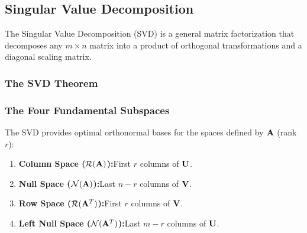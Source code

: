 \documentclass[../readings.tex]{subfiles}
\begin{document}
\subsection{Singular Value Decomposition}
\label{sub:svd-theory}

The Singular Value Decomposition (SVD) is a general matrix factorization that decomposes any $m \times n$ matrix into a product of orthogonal transformations and a diagonal scaling matrix.

\subsubsection{The SVD Theorem}

\label{thm:svd}


\subsubsection{The Four Fundamental Subspaces}

The SVD provides optimal orthonormal bases for the spaces defined by $\mathbf{A}$ (rank $r$):
\begin{enumerate}
    \item \textbf{Column Space ($\mathcal{R}(\mathbf{A})$):}\enspace First $r$ columns of $\mathbf{U}$.
    \item \textbf{Null Space ($\mathcal{N}(\mathbf{A})$):}\enspace Last $n-r$ columns of $\mathbf{V}$.
    \item \textbf{Row Space ($\mathcal{R}(\mathbf{A}^T)$):}\enspace First $r$ columns of $\mathbf{V}$.
    \item \textbf{Left Null Space ($\mathcal{N}(\mathbf{A}^T)$):}\enspace Last $m-r$ columns of $\mathbf{U}$.
\end{enumerate}
\end{document}
